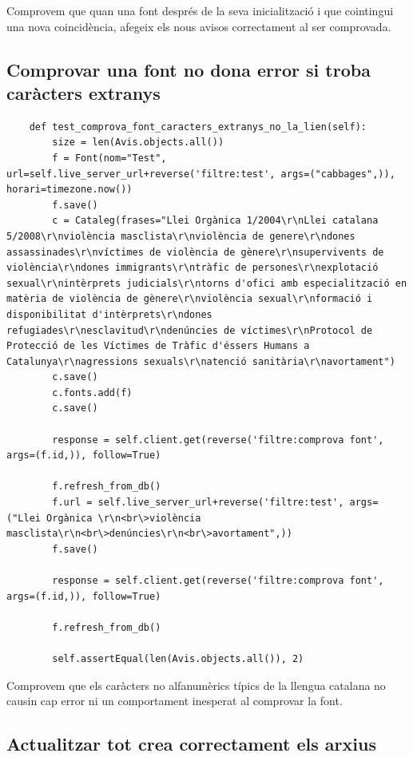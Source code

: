 \documentclass{article}
\begin{document}
Comprovem que quan una font després de la seva inicialització i que cointingui una nova coincidència, afegeix els nous avisos correctament al ser comprovada.

\subsection{Comprovar una font no dona error si troba caràcters extranys}

\begin{lstlisting}
    def test_comprova_font_caracters_extranys_no_la_lien(self):
        size = len(Avis.objects.all())
        f = Font(nom="Test", url=self.live_server_url+reverse('filtre:test', args=("cabbages",)), horari=timezone.now())
        f.save()
        c = Cataleg(frases="Llei Orgànica 1/2004\r\nLlei catalana 5/2008\r\nviolència masclista\r\nviolència de genere\r\ndones assassinades\r\nvíctimes de violència de gènere\r\nsupervivents de violència\r\ndones immigrants\r\ntràfic de persones\r\nexplotació sexual\r\nintèrprets judicials\r\ntorns d'ofici amb especialització en matèria de violència de gènere\r\nviolència sexual\r\nformació i disponibilitat d'intèrprets\r\ndones refugiades\r\nesclavitud\r\ndenúncies de víctimes\r\nProtocol de Protecció de les Víctimes de Tràfic d'éssers Humans a Catalunya\r\nagressions sexuals\r\natenció sanitària\r\navortament")
        c.save()
        c.fonts.add(f)
        c.save()

        response = self.client.get(reverse('filtre:comprova font', args=(f.id,)), follow=True)

        f.refresh_from_db()
        f.url = self.live_server_url+reverse('filtre:test', args=("Llei Orgànica \r\n<br\>violència masclista\r\n<br\>denúncies\r\n<br\>avortament",))
        f.save()

        response = self.client.get(reverse('filtre:comprova font', args=(f.id,)), follow=True)

        f.refresh_from_db()

        self.assertEqual(len(Avis.objects.all()), 2)
\end{lstlisting}

Comprovem que els caràcters no alfanumèrics típics de la llengua catalana no causin cap error ni un comportament inesperat al comprovar la font.

\subsection{Actualitzar tot crea correctament els arxius}
\end{document}
